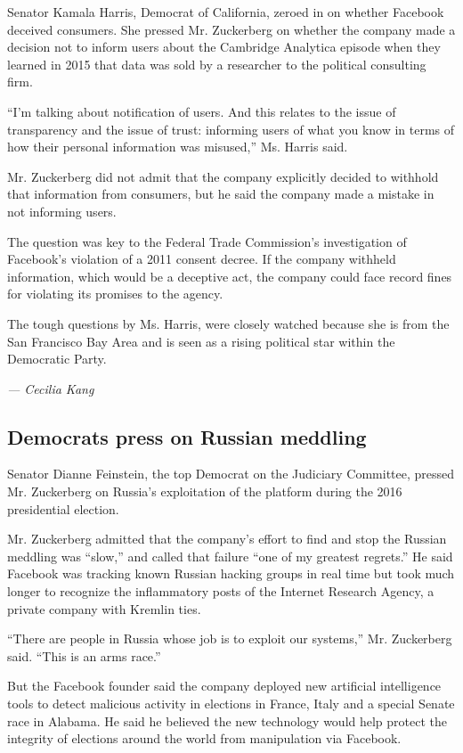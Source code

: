 Senator Kamala Harris, Democrat of California, zeroed in on whether
Facebook deceived consumers. She pressed Mr. Zuckerberg on whether the
company made a decision not to inform users about the Cambridge
Analytica episode when they learned in 2015 that data was sold by a
researcher to the political consulting firm.

``I'm talking about notification of users. And this relates to the issue
of transparency and the issue of trust: informing users of what you know
in terms of how their personal information was misused,'' Ms. Harris
said.

Mr. Zuckerberg did not admit that the company explicitly decided to
withhold that information from consumers, but he said the company made a
mistake in not informing users.

The question was key to the Federal Trade Commission's investigation of
Facebook's violation of a 2011 consent decree. If the company withheld
information, which would be a deceptive act, the company could face
record fines for violating its promises to the agency.

The tough questions by Ms. Harris, were closely watched because she is
from the San Francisco Bay Area and is seen as a rising political star
within the Democratic Party.

\emph{--- Cecilia Kang}

\hypertarget{democrats-press-on-russian-meddling}{%
\subsection{Democrats press on Russian
meddling}\label{democrats-press-on-russian-meddling}}

Senator Dianne Feinstein, the top Democrat on the Judiciary Committee,
pressed Mr. Zuckerberg on Russia's exploitation of the platform during
the 2016 presidential election.

Mr. Zuckerberg admitted that the company's effort to find and stop the
Russian meddling was ``slow,'' and called that failure ``one of my
greatest regrets.'' He said Facebook was tracking known Russian hacking
groups in real time but took much longer to recognize the inflammatory
posts of the Internet Research Agency, a private company with Kremlin
ties.

``There are people in Russia whose job is to exploit our systems,'' Mr.
Zuckerberg said. ``This is an arms race.''

But the Facebook founder said the company deployed new artificial
intelligence tools to detect malicious activity in elections in France,
Italy and a special Senate race in Alabama. He said he believed the new
technology would help protect the integrity of elections around the
world from manipulation via Facebook.

